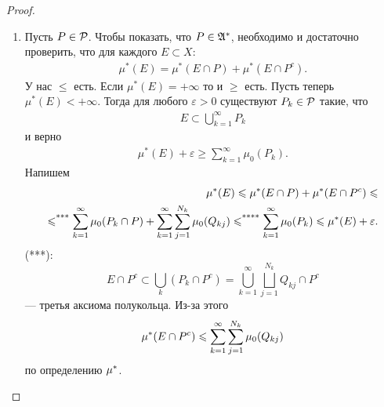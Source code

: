 \documentclass[a4paper,14pt]{extarticle}
\theoremstyle{definition}
\theoremstyle{plain}
\theoremstyle{plain}
\theoremstyle{plain}
\theoremstyle{plain}
\theoremstyle{definition}
\theoremstyle{definition}
\theoremstyle{definition}
\theoremstyle{definition}
\theoremstyle{definition}
\theoremstyle{definition}
\theoremstyle{plain}
\theoremstyle{plain}
\theoremstyle{plain}
\theoremstyle{plain}
\theoremstyle{definition}
\theoremstyle{definition}
\theoremstyle{definition}
\theoremstyle{definition}
\theoremstyle{definition}
\newcommand{\A}{\ensuremath \mathfrak{A}}
\newcommand{\p}{\ensuremath \mathcal{P}}
\newcommand{\mua}{\ensuremath \mu^\ast}
\begin{document}
\begin{proof}\
 \begin{enumerate}
  \item Пусть $ P \in \p $. Чтобы показать, что $ P \in \A^\ast $, необходимо и достаточно проверить, что для каждого $ E \subset X $:
  \begin{align*}
   \mu^\ast(E) = \mu^\ast(E \cap P) + \mu^\ast(E \cap P^c)
   .\end{align*} У нас $ \leqslant $ есть. Если $ \mu^\ast(E) = +\infty $ то и $ \geqslant $ есть. Пусть теперь $ \mu^\ast(E) < +\infty $. Тогда для любого $ \varepsilon > 0 $ существуют $ P_k \in \p $ такие, что
  \begin{align*}
   E \subset \bigcup_{k=1}^\infty P_k
  \end{align*} и верно
  \begin{align*}
   \mu^\ast(E) + \varepsilon \geqslant \sum_{k=1}^{\infty} \mu_0(P_k)
   .\end{align*} Напишем
  \begin{align*}
   \mu^\ast(E) \leqslant \mua(E \cap P) + \mua(E \cap P^c) \leqslant \\
   \leqslant^{\text{***}} \sum_{k=1}^{\infty} \mu_0(P_k \cap P) + \sum_{k=1}^{\infty} \sum_{j=1}^{N_k}   \mu_0 (Q_{kj} ) \leqslant^{\text{****}} \sum_{k=1}^{\infty} \mu_0(P_k) \leqslant \mua(E) + \varepsilon
   .\end{align*} (***): $$ E \cap P^c \subset \bigcup_k (P_k \cap P^c) = \bigcup_{k=1}^\infty \bigsqcup_{j=1}^{N_k} Q_{kj} \cap P^c $$ --- третья аксиома полукольца. Из-за этого
  \begin{align*}
   \mua(E \cap P^c) \leqslant \sum_{k=1}^{\infty} \sum_{j=1}^{N_k}  \mu_0(Q_{kj})
  \end{align*} по определению $ \mua $.


\end{enumerate}
\end{proof}
\end{document}
